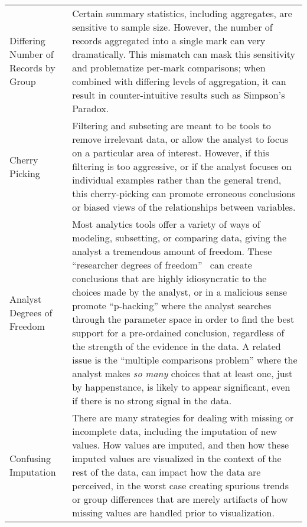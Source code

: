 \begin{table*}[h!]
\begin{tabular}{p{5cm}p{12cm}}
   \rowcolor{colorb}\multirow{4}{0em}{\hspace{-0.6cm}\rotatebox{90}{\normalsize{Wrangling}}}Differing Number of Records by Group  & Certain summary statistics, including aggregates, are sensitive to sample size. However, the number of records aggregated into a single mark can very dramatically. This mismatch can mask this sensitivity and problematize per-mark comparisons; when combined with differing levels of aggregation, it can result in counter-intuitive results such as Simpson's Paradox. \cite{guo2017you}\\
 \rowcolor{colorb-opaque}Cherry Picking & Filtering and subseting are meant to be tools to remove irrelevant data, or allow the analyst to focus on a particular area of interest. However, if this filtering is too aggressive, or if the analyst focuses on individual examples rather than the general trend, this cherry-picking can promote erroneous conclusions or biased views of the relationships between variables. \cite{few2019loom}\\
 \rowcolor{colorb}Analyst Degrees of Freedom & Most analytics tools offer a variety of ways of modeling, subsetting, or comparing data, giving the analyst a tremendous amount of freedom. These ``researcher degrees of freedom''~\cite{} can create conclusions that are highly idiosyncratic to the choices made by the analyst, or in a malicious sense promote ``p-hacking'' where the analyst searches through the parameter space in order to find the best support for a pre-ordained conclusion, regardless of the strength of the evidence in the data. A related issue is the ``multiple comparisons problem'' where the analyst makes \emph{so many} choices that at least one, just by happenstance, is likely to appear significant, even if there is no strong signal in the data. \cite{gelman2013garden,pu2018garden,zgraggen2018investigating}\\
 \rowcolor{colorb-opaque}Confusing Imputation & There are many strategies for dealing with missing or incomplete data, including the imputation of new values. How values are imputed, and then how these imputed values are visualized in the context of the rest of the data, can impact how the data are perceived, in the worst case creating spurious trends or group differences that are merely artifacts of how missing values are handled prior to visualization. \cite{song2018s}\\


\end{tabular}
\end{table*}
